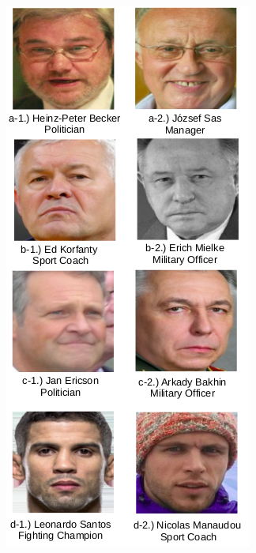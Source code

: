 \documentclass[12pt,english]{article}
\begin{document}
\begin{figure}[H]
  \centering
  \begin{minipage}[b]{0.48\textwidth}
    \includegraphics[width=\textwidth]{figures/ex2_fp.png}

\end{minipage}
\end{figure}
\end{document}

